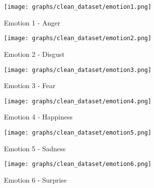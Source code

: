 \begin{figure}[!ht]
\center
	\caption{Emotion 1 - Anger}  
	\texttt{[image: graphs/clean\_dataset/emotion1.png]}
	 
	
   \label{fig:decisionTrees1}
\end{figure}

\begin{figure}[!ht]
\center
	\caption{Emotion 2 - Disgust}  
	\texttt{[image: graphs/clean\_dataset/emotion2.png]}
	 
	
   \label{fig:decisionTrees2}
\end{figure}

\begin{figure}[!ht]
\center
	\caption{Emotion 3 - Fear}  
	\texttt{[image: graphs/clean\_dataset/emotion3.png]}
	 
	
   \label{fig:decisionTrees3}
\end{figure}

\begin{figure}[!ht]
\center
	\caption{Emotion 4 - Happiness}  
	\texttt{[image: graphs/clean\_dataset/emotion4.png]}
	 
	
   \label{fig:decisionTrees4}
\end{figure}

\begin{figure}[!ht]
\center
	\caption{Emotion 5 - Sadness}  
	\texttt{[image: graphs/clean\_dataset/emotion5.png]}
	 
	
   \label{fig:decisionTrees5}
\end{figure}

\begin{figure}[!ht]
\center
	\caption{Emotion 6 - Surprise}  
	\texttt{[image: graphs/clean\_dataset/emotion6.png]}
	 
	
   \label{fig:decisionTrees6}
\end{figure}
